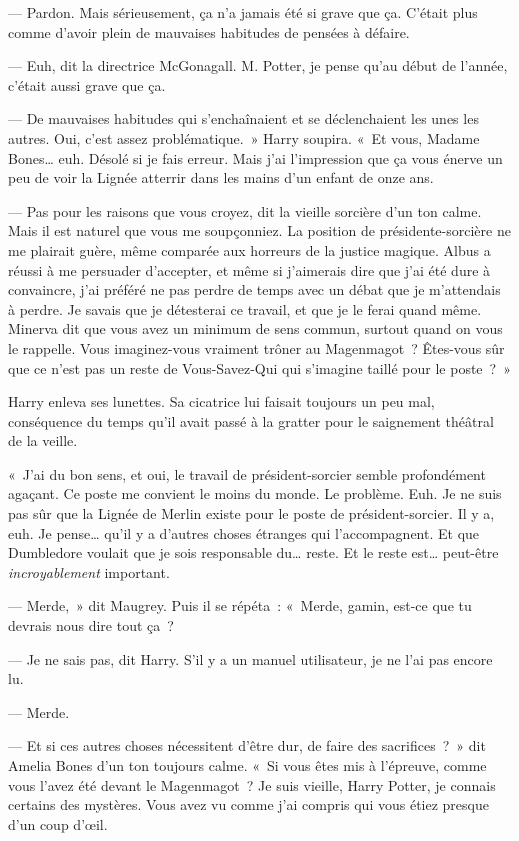 --- Pardon. Mais sérieusement, ça n'a jamais été si grave que ça. C'était plus comme d'avoir plein de mauvaises habitudes de pensées à défaire.

--- Euh, dit la directrice McGonagall. M. Potter, je pense qu'au début de l'année, c'était aussi grave que ça.

--- De mauvaises habitudes qui s'enchaînaient et se déclenchaient les unes les autres. Oui, c'est assez problématique.~» Harry soupira. «~Et vous, Madame Bones… euh. Désolé si je fais erreur. Mais j'ai l'impression que ça vous énerve un peu de voir la Lignée atterrir dans les mains d'un enfant de onze ans.

--- Pas pour les raisons que vous croyez, dit la vieille sorcière d'un ton calme. Mais il est naturel que vous me soupçonniez. La position de présidente-sorcière ne me plairait guère, même comparée aux horreurs de la justice magique. Albus a réussi à me persuader d'accepter, et même si j'aimerais dire que j'ai été dure à convaincre, j'ai préféré ne pas perdre de temps avec un débat que je m'attendais à perdre. Je savais que je détesterai ce travail, et que je le ferai quand même. Minerva dit que vous avez un minimum de sens commun, surtout quand on vous le rappelle. Vous imaginez-vous vraiment trôner au Magenmagot~? Êtes-vous sûr que ce n'est pas un reste de Vous-Savez-Qui qui s'imagine taillé pour le poste~?~»

Harry enleva ses lunettes. Sa cicatrice lui faisait toujours un peu mal, conséquence du temps qu'il avait passé à la gratter pour le saignement théâtral de la veille.

«~J'ai du bon sens, et oui, le travail de président-sorcier semble profondément agaçant. Ce poste me convient le moins du monde. Le problème. Euh. Je ne suis pas sûr que la Lignée de Merlin existe pour le poste de président-sorcier. Il y a, euh. Je pense… qu'il y a d'autres choses étranges qui l'accompagnent. Et que Dumbledore voulait que je sois responsable du… reste. Et le reste est… peut-être \emph{incroyablement} important.

--- Merde,~» dit Maugrey. Puis il se répéta~: «~Merde, gamin, est-ce que tu devrais nous dire tout ça~?

--- Je ne sais pas, dit Harry. S'il y a un manuel utilisateur, je ne l'ai pas encore lu.

--- Merde.

--- Et si ces autres choses nécessitent d'être dur, de faire des sacrifices~?~» dit Amelia Bones d'un ton toujours calme. «~Si vous êtes mis à l'épreuve, comme vous l'avez été devant le Magenmagot~? Je suis vieille, Harry Potter, je connais certains des mystères. Vous avez vu comme j'ai compris qui vous étiez presque d'un coup d'œil.

